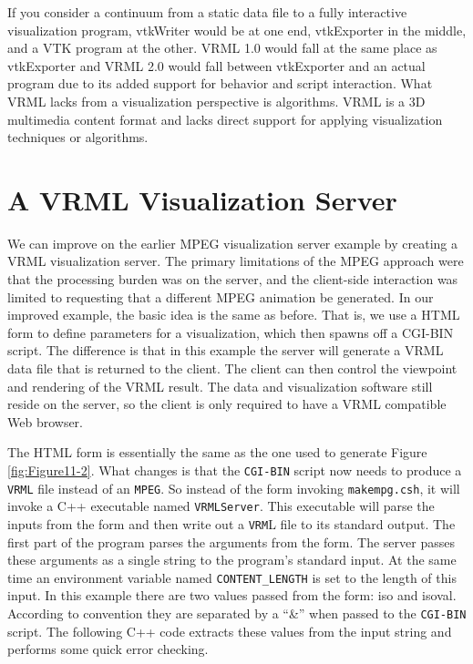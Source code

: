 If you consider a continuum from a static data file to a fully interactive visualization program, vtkWriter would be at one end, vtkExporter in the middle, and a VTK program at the other. VRML 1.0 would fall at the same place as vtkExporter and VRML 2.0 would fall between vtkExporter and an actual program due to its added support for behavior and script interaction. What VRML lacks from a visualization perspective is algorithms. VRML is a 3D multimedia content format and lacks direct support for applying visualization techniques or algorithms.

\section{A VRML Visualization Server}

We can improve on the earlier MPEG visualization server example by creating a VRML visualization server. The primary limitations of the MPEG approach were that the processing burden was on the server, and the client-side interaction was limited to requesting that a different MPEG animation be generated. In our improved example, the basic idea is the same as before. That is, we use a HTML form to define parameters for a visualization, which then spawns off a CGI-BIN script. The difference is that in this example the server will generate a VRML data file that is returned to the client. The client can then control the viewpoint and rendering of the VRML result. The data and visualization software still reside on the server, so the client is only required to have a VRML compatible Web browser.

The HTML form is essentially the same as the one used to generate Figure \ref{fig:Figure11-2}. What changes is that the \texttt{CGI-BIN} script now needs to produce a \texttt{VRML} file instead of an \texttt{MPEG}. So instead of the form invoking \texttt{makempg.csh}, it will invoke a C++ executable named \texttt{VRMLServer}. This executable will parse the inputs from the form and then write out a \texttt{VRM}L file to its standard output. The first part of the program parses the arguments from the form. The server passes these arguments as a single string to the program's standard input. At the same time an environment variable named \texttt{CONTENT\_LENGTH} is set to the length of this input. In this example there are two values passed from the form: iso and isoval. According to convention they are separated by a ``\&'' when passed to the \texttt{CGI-BIN} script. The following C++ code extracts these values from the input string and performs some quick error checking.

